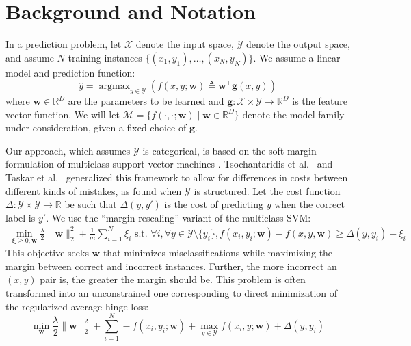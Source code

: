 \documentclass{article} %
\DeclareMathOperator*{\argmax}{argmax}
\newcommand{\bmcomment}[1]{\textcolor{blue}{\textsc{\textbf{[#1 --bm]}}}}
\begin{document}

%

\section{Background and Notation}

In a prediction problem, let $\mathcal{X}$ denote the input space,
$\mathcal{Y}$ denote the output space, and assume $N$ training
instances $\{(x_1, y_1), \ldots, (x_N, y_N)\}$.  We assume a linear
model and prediction function:
\begin{equation}
\hat{y} = \argmax_{y \in \mathcal{Y}} \left(f(x, y;\mathbf{w}) \triangleq \mathbf{w}^\top \mathbf{g}(x, y) \right)
\end{equation}
where $\mathbf{w} \in \mathbb{R}^D$ are the parameters to be learned
and $\mathbf{g} : \mathcal{X} \times \mathcal{Y} \rightarrow
\mathbb{R}^D$ is the feature vector function.  We will let
$\mathcal{M} =\{f(\cdot,\cdot;\mathbf{w}) \mid \mathbf{w} \in
\mathbb{R}^D\}$ denote the model family under consideration, given a
fixed choice of $\mathbf{g}$.

Our approach, which assumes $\mathcal{Y}$ is categorical, is based on
the soft margin formulation of multiclass support vector machines
\citep{vapnik1998statistical,crammer2002algorithmic,weston1998multi}.
Tsochantaridis et al.~\citep{tsochantaridis2004support} and Taskar et
al.~\citep{koller2003max} generalized this framework to allow for
differences in costs between different kinds of mistakes, as found
when $\mathcal{Y}$ is structured.  Let the cost function
$\Delta:\mathcal{Y}\times\mathcal{Y}\rightarrow\mathbb{R}$  be such
that $\Delta(y, y')$ is the cost of predicting $y$ when the correct
label is $y'$.  We use the ``margin rescaling'' variant of the multiclass SVM:
\begin{align}
 \min_{\boldsymbol{\xi}\geq 0, \mathbf{w}}
\frac{\lambda}{2}\|\mathbf{w}\|_2^2+\frac{1}{m}\sum_{i=1}^N\xi_i 
 \text{\ \ \ s.t.\ \ \ } \forall i,  \forall y \in \mathcal{Y} \setminus
 \{y_i\},  f(x_i, y_i; \mathbf{w}) - f(x, y, \mathbf{w}) \geq
 \Delta(y, y_i) - \xi_i \label{marginRescaling}
\end{align}
This objective seeks $\mathbf{w}$ that minimizes misclassifications while
maximizing the margin between correct and incorrect instances.
Further, the more incorrect an $(x,y)$ pair is, the greater the margin
should be.  This problem is often transformed into an unconstrained
one corresponding to direct minimization of the regularized average
hinge loss:
\begin{equation}
\label{svmObjective}
\min_{\mathbf{w}} \frac{\lambda}{2}\|\mathbf{w}\|_2^2 +
\sum_{i=1}^N  -f(x_i, y_i; \mathbf{w}) + \max_{y \in \mathcal{Y}}
  f(x_i, y; \mathbf{w}) + \Delta(y, y_i)
\end{equation}
\end{document}
